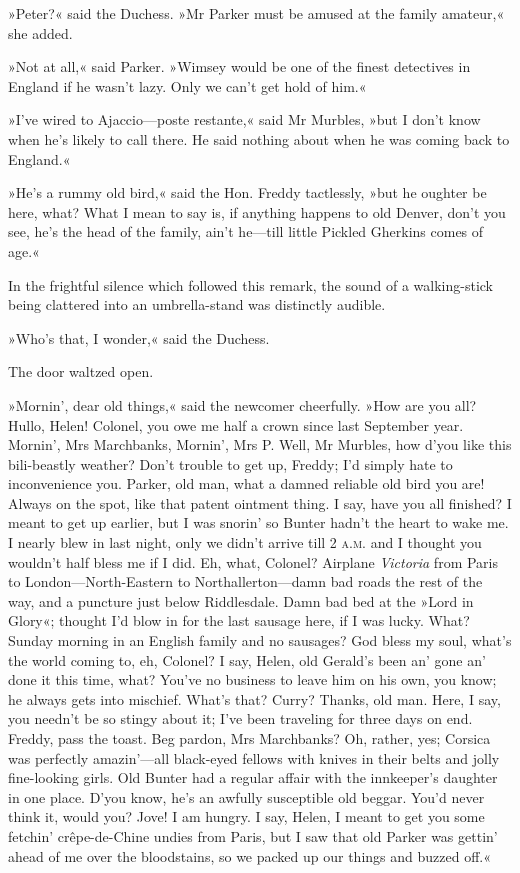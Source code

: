 »Peter?« said the Duchess. »Mr Parker must be amused at the family amateur,« she added.

»Not at all,« said Parker. »Wimsey would be one of the finest detectives in England if he wasn't lazy. Only we can't get hold of him.«

»I've wired to Ajaccio\allowbreak---\allowbreak poste restante,« said Mr Murbles, »but I don't know when he's likely to call there. He said nothing about when he was coming back to England.«

»He's a rummy old bird,« said the Hon. Freddy tactlessly, »but he oughter be here, what? What I mean to say is, if anything happens to old Denver, don't you see, he's the head of the family, ain't he\allowbreak---\allowbreak till little Pickled Gherkins comes of age.«

In the frightful silence which followed this remark, the sound of a walking-stick being clattered into an umbrella-stand was distinctly
audible.

»Who's that, I wonder,« said the Duchess.

The door waltzed open.

»Mornin', dear old things,« said the newcomer cheerfully. »How are you all? Hullo, Helen! Colonel, you owe me half a crown since last September year. Mornin', Mrs Marchbanks, Mornin', Mrs P. Well, Mr  Murbles, how d'you like this bili-beastly weather? Don't trouble to get up, Freddy; I'd simply hate to inconvenience you. Parker, old man, what a damned reliable old bird you are! Always on the spot, like that patent ointment thing. I say, have you all finished? I meant to get up earlier, but I was snorin' so Bunter hadn't the heart to wake me. I nearly blew in last night, only we didn't arrive till 2 \textsc{a.m.} and I thought you wouldn't half bless me if I did. Eh, what, Colonel? Airplane \textit{Victoria} from Paris to London\allowbreak---\allowbreak North-Eastern to Northallerton\allowbreak---\allowbreak damn bad roads the rest of the way, and a puncture just below Riddlesdale. Damn bad bed at the »Lord in Glory«; thought I'd blow in for the last sausage here, if I was lucky. What? Sunday morning in an English family and no sausages? God bless my soul, what's the world coming to, eh, Colonel? I say, Helen, old Gerald's been an' gone an' done it this time, what? You've no business to leave him on his own, you know; he always gets into mischief. What's that? Curry? Thanks, old man. Here, I say, you needn't be so stingy about it; I've been traveling for three days on end. Freddy, pass the toast. Beg pardon, Mrs Marchbanks? Oh, rather, yes; Corsica was perfectly amazin'---all black-eyed fellows with knives in their belts and jolly fine-looking girls. Old Bunter had a regular affair with the innkeeper's daughter in one place. D'you know, he's an awfully susceptible old beggar. You'd never think it, would you? Jove! I am hungry. I say, Helen, I meant to get you some fetchin' crêpe-de-Chine undies from Paris, but I saw that old Parker was gettin' ahead of me over the bloodstains, so we packed up our things and buzzed off.«

